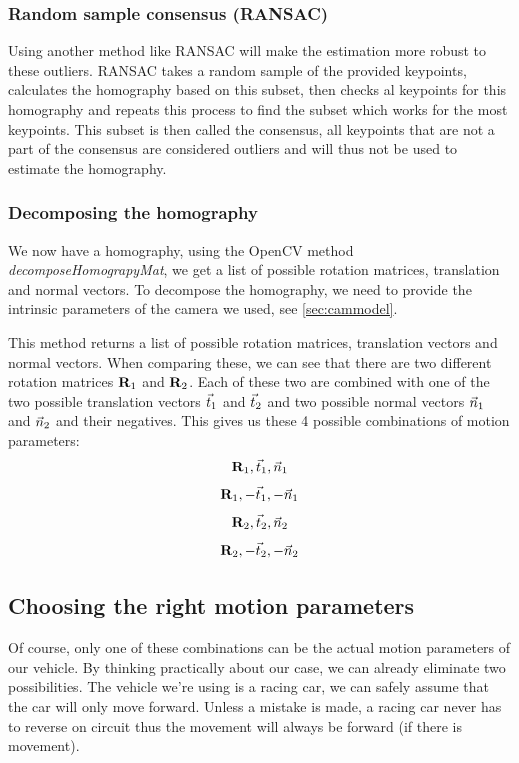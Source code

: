 \subsubsection{Random sample consensus (RANSAC)}
Using another method like RANSAC will make the estimation more robust to these outliers. RANSAC takes a random sample of the provided keypoints, calculates the homography based on this subset, then checks al keypoints for this homography and repeats this process to find the subset which works for the most keypoints. This subset is then called the consensus, all keypoints that are not a part of the consensus are considered outliers and will thus not be used to estimate the homography. 

\subsubsection{Decomposing the homography}
We now have a homography, using the OpenCV method \textit{decomposeHomograpyMat}, we get a list of possible rotation matrices, translation and normal vectors. To decompose the homography, we need to provide the intrinsic parameters of the camera we used, see \autoref{sec:cammodel}.\bigskip

This method returns a list of possible rotation matrices, translation vectors and normal vectors. When comparing these, we can see that there are two different rotation matrices $\mathbf{R}_1$ and $\mathbf{R}_2$. Each of these two are combined with one of the two possible translation vectors $\vec t_1$ and $\vec t_2$ and two possible normal vectors $\vec n_1$ and $\vec n_2$ and their negatives. This gives us these 4 possible combinations of motion parameters:
\begin{equation*}
    \mathbf{R}_1, \vec t_1, \vec n_1
\end{equation*}
\begin{equation*}
    \mathbf{R}_1, -\vec t_1, -\vec n_1
\end{equation*}
\begin{equation*}
    \mathbf{R}_2, \vec t_2, \vec n_2
\end{equation*}
\begin{equation*}
    \mathbf{R}_2, -\vec t_2, -\vec n_2
\end{equation*}

\subsection{Choosing the right motion parameters}
Of course, only one of these combinations can be the actual motion parameters of our vehicle. By thinking practically about our case, we can already eliminate two possibilities. The vehicle we're using is a racing car, we can safely assume that the car will only move forward. Unless a mistake is made, a racing car never has to reverse on circuit thus the movement will always be forward (if there is movement).\bigskip

